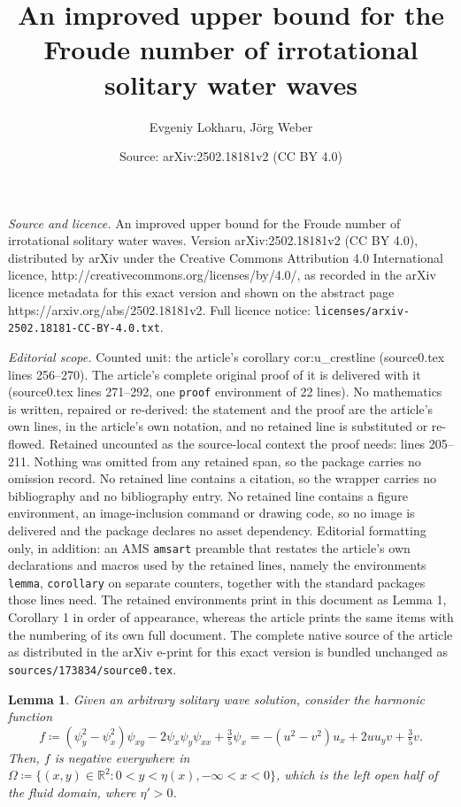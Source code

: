 \documentclass[10pt,a4paper]{amsart}
\title{An improved upper bound for the Froude number of irrotational solitary water waves}
\author{Evgeniy Lokharu, J\"org Weber}
\date{Source: arXiv:2502.18181v2 (CC BY 4.0)}
\newtheorem{lemma}{Lemma}
\newcommand{\R}{\mathbb R}
\begin{document}
\maketitle

\noindent\emph{Source and licence.} An improved upper bound for the Froude number of irrotational solitary water waves. Version arXiv:2502.18181v2 (CC BY 4.0), distributed by arXiv under the Creative Commons Attribution 4.0 International licence, http://creativecommons.org/licenses/by/4.0/, as recorded in the arXiv licence metadata for this exact version and shown on the abstract page https://arxiv.org/abs/2502.18181v2. Full licence notice: \texttt{licenses/arxiv-2502.18181-CC-BY-4.0.txt}.\par\smallskip

\noindent\textit{Editorial scope.} Counted unit: the article's corollary cor:u\_crestline (source0.tex lines 256--270). The article's complete original proof of it is delivered with it (source0.tex lines 271--292, one \texttt{proof} environment of 22 lines). No mathematics is written, repaired or re-derived: the statement and the proof are the article's own lines, in the article's own notation, and no retained line is substituted or re-flowed.  Retained uncounted as the source-local context the proof needs: lines 205--211.  Nothing was omitted from any retained span, so the package carries no omission record.  No retained line contains a citation, so the wrapper carries no bibliography and no bibliography entry.  No retained line contains a figure environment, an image-inclusion command or drawing code, so no image is delivered and the package declares no asset dependency.  Editorial formatting only, in addition: an AMS \texttt{amsart} preamble that restates the article's own declarations and macros used by the retained lines, namely the environments \texttt{lemma}, \texttt{corollary} on separate counters, together with the standard packages those lines need.  The retained environments print in this document as Lemma 1, Corollary 1 in order of appearance, whereas the article prints the same items with the numbering of its own full document.  The complete native source of the article as distributed in the arXiv e-print for this exact version is bundled unchanged as \texttt{sources/173834/source0.tex}.
\begin{lemma} \label{thm:slope}
	Given an arbitrary solitary wave solution, consider the harmonic function 
	\[
	f \coloneqq (\psi_y^2-\psi_x^2)\psi_{xy}-2\psi_x\psi_y\psi_{xx}+\tfrac35\psi_x = -(u^2-v^2)u_x+2u u_y v+\tfrac35v.
	\]
	Then, $f$ is negative everywhere in $\Omega\coloneqq\{(x,y)\in\R^2:0<y<\eta(x),-\infty<x<0\}$, which is the left open half of the fluid domain, where $\eta' > 0$.
\end{lemma}
\end{document}

